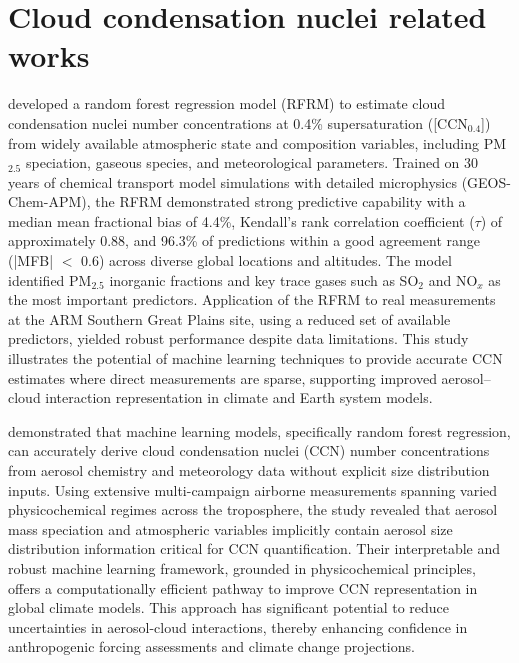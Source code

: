 \documentclass[11pt]{article}
\begin{document}
\section{Cloud condensation nuclei related works}
\citet{nair2020using} developed a random forest regression model (RFRM) to estimate cloud condensation nuclei number concentrations at 0.4\% supersaturation ([CCN$_{0.4}$]) from widely available atmospheric state and composition variables, including PM$_{2.5}$ speciation, gaseous species, and meteorological parameters. Trained on 30 years of chemical transport model simulations with detailed microphysics (GEOS-Chem-APM), the RFRM demonstrated strong predictive capability with a median mean fractional bias of 4.4\%, Kendall’s rank correlation coefficient (\(\tau\)) of approximately 0.88, and 96.3\% of predictions within a good agreement range (|MFB| $<$ 0.6) across diverse global locations and altitudes. The model identified PM$_{2.5}$ inorganic fractions and key trace gases such as SO$_2$ and NO$_x$ as the most important predictors. Application of the RFRM to real measurements at the ARM Southern Great Plains site, using a reduced set of available predictors, yielded robust performance despite data limitations. This study illustrates the potential of machine learning techniques to provide accurate CCN estimates where direct measurements are sparse, supporting improved aerosol–cloud interaction representation in climate and Earth system models.

\citet{nair2021machine} demonstrated that machine learning models, specifically random forest regression, can accurately derive cloud condensation nuclei (CCN) number concentrations from aerosol chemistry and meteorology data without explicit size distribution inputs. Using extensive multi-campaign airborne measurements spanning varied physicochemical regimes across the troposphere, the study revealed that aerosol mass speciation and atmospheric variables implicitly contain aerosol size distribution information critical for CCN quantification. Their interpretable and robust machine learning framework, grounded in physicochemical principles, offers a computationally efficient pathway to improve CCN representation in global climate models. This approach has significant potential to reduce uncertainties in aerosol-cloud interactions, thereby enhancing confidence in anthropogenic forcing assessments and climate change projections.
\end{document}
